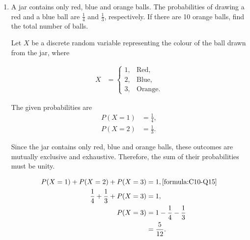 \begin{enumerate}[label=\thesubsection.\arabic*, ref=\thesubsection.\theenumi]
    The twentieth partial sum is consequently
    \begin{align*}
        S_{20} & =\frac{20}{2}\bigl(2a+19d\bigr)=10(4-38)=-340.
    \end{align*}

    The sequence generated by $(a,d)=(2,-2)$ has $t_6=-8$ and $t_{14}=-24=2t_8$, confirming both data constraints.

    The following code verifies the solution.

    \begin{lstlisting}[frame=single, basicstyle=\rmfamily, escapeinside={(*@}{@*)}]
(*@\makebox[\dimexpr\linewidth-2\fboxsep-2\fboxrule\relax][c]{codes/C10/Q11.py}@*)
    \end{lstlisting}


    \item
    \label{question:C10-Q15}
    \label{question-short:C10-Q15} A jar contains only red, blue and orange balls. The probabilities of drawing a red and a blue ball are $\frac14$ and $\frac13$, respectively. If there are 10 orange balls, find the total number of balls.

    \par
    \smallskip
    \solution


	Let $X$ be a discrete random variable representing the colour of the ball drawn from the jar, where

	\begin{align*}
	X &=
	\begin{cases}
	1, & \text{Red},\\
	2, & \text{Blue},\\
	3, & \text{Orange}.
	\end{cases}
	\end{align*}

	The given probabilities are
	\begin{align*}
	P(X=1) &= \frac14,\\
	P(X=2) &= \frac13.
	\end{align*}

	Since the jar contains only red, blue and orange balls, these outcomes are mutually exclusive and exhaustive. Therefore, the sum of their probabilities must be unity.

	\begin{align*}
	P(X=1)+P(X=2)+P(X=3) &= 1, \hfill\eqref{formula:C10-Q15}	\\
	\frac14+\frac13+P(X=3) &= 1,\\
	P(X=3) &= 1-\frac14-\frac13\\
	&= \frac5{12}.
	\end{align*}


\end{enumerate}
